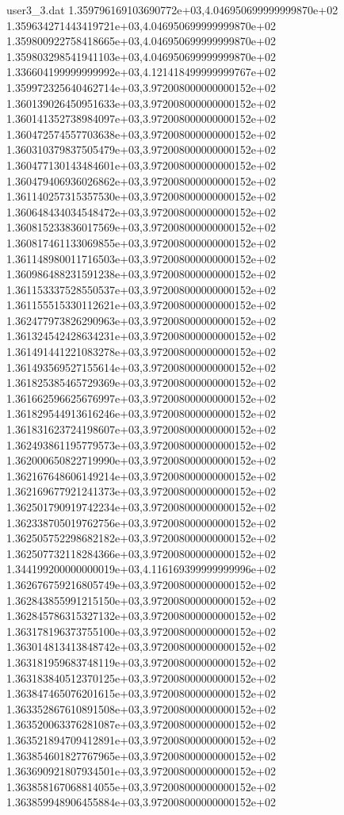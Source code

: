 \begin{filecontents}{user3_3.dat}
1.359796169103690772e+03,4.046950699999999870e+02
1.359634271443419721e+03,4.046950699999999870e+02
1.359800922758418665e+03,4.046950699999999870e+02
1.359803298541941103e+03,4.046950699999999870e+02
1.336604199999999992e+03,4.121418499999999767e+02
1.359972325640462714e+03,3.972008000000000152e+02
1.360139026450951633e+03,3.972008000000000152e+02
1.360141352738984097e+03,3.972008000000000152e+02
1.360472574557703638e+03,3.972008000000000152e+02
1.360310379837505479e+03,3.972008000000000152e+02
1.360477130143484601e+03,3.972008000000000152e+02
1.360479406936026862e+03,3.972008000000000152e+02
1.361140257315357530e+03,3.972008000000000152e+02
1.360648434034548472e+03,3.972008000000000152e+02
1.360815233836017569e+03,3.972008000000000152e+02
1.360817461133069855e+03,3.972008000000000152e+02
1.361148980011716503e+03,3.972008000000000152e+02
1.360986488231591238e+03,3.972008000000000152e+02
1.361153337528550537e+03,3.972008000000000152e+02
1.361155515330112621e+03,3.972008000000000152e+02
1.362477973826290963e+03,3.972008000000000152e+02
1.361324542428634231e+03,3.972008000000000152e+02
1.361491441221083278e+03,3.972008000000000152e+02
1.361493569527155614e+03,3.972008000000000152e+02
1.361825385465729369e+03,3.972008000000000152e+02
1.361662596625676997e+03,3.972008000000000152e+02
1.361829544913616246e+03,3.972008000000000152e+02
1.361831623724198607e+03,3.972008000000000152e+02
1.362493861195779573e+03,3.972008000000000152e+02
1.362000650822719990e+03,3.972008000000000152e+02
1.362167648606149214e+03,3.972008000000000152e+02
1.362169677921241373e+03,3.972008000000000152e+02
1.362501790919742234e+03,3.972008000000000152e+02
1.362338705019762756e+03,3.972008000000000152e+02
1.362505752298682182e+03,3.972008000000000152e+02
1.362507732118284366e+03,3.972008000000000152e+02
1.344199200000000019e+03,4.116169399999999996e+02
1.362676759216805749e+03,3.972008000000000152e+02
1.362843855991215150e+03,3.972008000000000152e+02
1.362845786315327132e+03,3.972008000000000152e+02
1.363178196373755100e+03,3.972008000000000152e+02
1.363014813413848742e+03,3.972008000000000152e+02
1.363181959683748119e+03,3.972008000000000152e+02
1.363183840512370125e+03,3.972008000000000152e+02
1.363847465076201615e+03,3.972008000000000152e+02
1.363352867610891508e+03,3.972008000000000152e+02
1.363520063376281087e+03,3.972008000000000152e+02
1.363521894709412891e+03,3.972008000000000152e+02
1.363854601827767965e+03,3.972008000000000152e+02
1.363690921807934501e+03,3.972008000000000152e+02
1.363858167068814055e+03,3.972008000000000152e+02
1.363859948906455884e+03,3.972008000000000152e+02

\end{filecontents}
